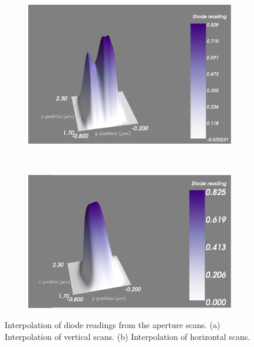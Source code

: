 \begin{figure}
    \centering
    \begin{subfigure}[b]{0.9\textwidth}
            \centering
            \includegraphics[width=\textwidth]{figures/beam/vert_scans_interp.pdf}
            \caption{}
            \label{fig:Interpolation of vertical aperture scans}
    \end{subfigure}
    \\
    \begin{subfigure}[b]{0.9\textwidth}
            \centering
            \includegraphics[width=\textwidth]{figures/beam/horiz_scans_interp.pdf}
            \caption{}
            \label{fig:Interpolation of horizontal aperture scans}
    \end{subfigure}
    \caption{Interpolation of diode readings from the aperture scans.
    (a) Interpolation of vertical scans.
    (b) Interpolation of horizontal scans.}
    \label{fig:Interpolation of aperture scans}
\end{figure}
